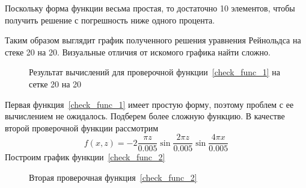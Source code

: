 \documentclass[a4paper,14pt]{extarticle}
\begin{document}
\noindent Поскольку форма функции весьма простая, то достаточно 10 элементов, чтобы получить решение с погрешность ниже одного процента.

Таким образом выглядит график полученного решения уравнения Рейнольдса на стеке 20 на 20. Визуальные отличия от искомого графика найти сложно.
\begin{figure}[!htbp]
	\caption{Результат вычислений для проверочной функции~\eqref{check_func_1} на сетке 20 на 20}
	\label{res_check_func_1}
\end{figure}


Первая функция~\eqref{check_func_1} имеет простую форму, поэтому проблем с ее вычислением не ожидалось. Подберем более сложную функцию. В качестве второй проверочной функции рассмотрим
\begin{equation}
	f(x, z) = -2 \frac{\pi z}{0.005} \sin{\frac{2 \pi z}{0.005}} \sin{\frac{4 \pi x}{0.005}}
	\label{check_func_2}
\end{equation}
\newpage
Построим график функции~\eqref{check_func_2}
\begin{figure}[!htbp]
	\caption{Вторая проверочная функция~\eqref{check_func_2}}
	\label{check_func_2_pic}
\end{figure}
\end{document}
